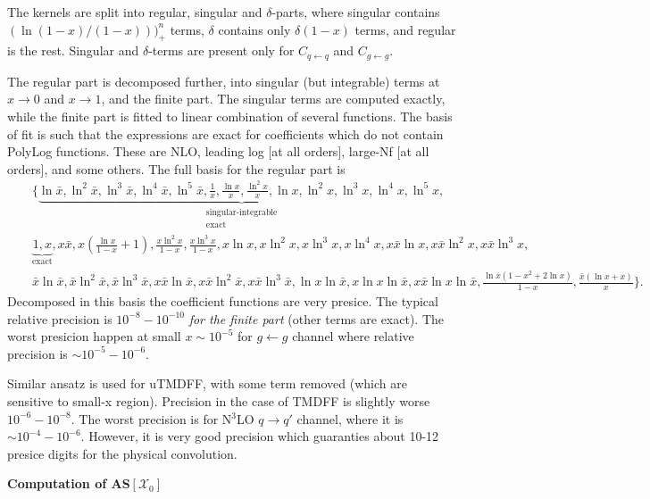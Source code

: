 \documentclass[prd,nofootinbib,eqsecnum,final]{revtex4}
\newcommand{\nn}{\nonumber}
\newcommand{\ot}{\leftarrow}
\renewcommand{\(}{\left(}
\renewcommand{\)}{\right)}
\renewcommand{\[}{\left[}
\renewcommand{\]}{\right]}
\begin{document}
The kernels are split into regular, singular and $\delta$-parts, where singular contains $(\ln(1-x)/(1-x)))_+^n$ terms, $\delta$ contains only $\delta(1-x)$ terms, and regular is the rest. Singular and $\delta$-terms are present only for $C_{q\ot q}$ and $C_{g\ot g}$.

The regular part is decomposed further, into singular (but integrable) terms at $x\to0 $ and $x\to 1$, and the finite part. The singular terms are computed exactly, while the finite part is fitted to linear combination of several functions. The basis of fit is such that the expressions are exact for coefficients which do not contain PolyLog functions. These are NLO, leading log [at all orders], large-Nf [at all orders], and some others. The full basis for the regular part is
\begin{eqnarray}
&&\Big\{\underbrace{\ln \bar x,\ln^2\bar x,\ln^3\bar x,\ln^4\bar x,\ln^5\bar x,
\frac{1}{x},\frac{\ln x}{x},\frac{\ln^2x}{x},
\ln x,\ln^2x,\ln^3x,\ln^4x,\ln^5x,}_{\substack{\text{singular-integrable} \\ \text{exact}}}
\\\nn&&
\underbrace{1,x}_{\text{exact}},x\bar x ,
x\(\frac{\ln x}{1-x}+1\), \frac{x \ln^2x}{1-x}, \frac{x\ln^3x}{1-x},
x\ln x,x\ln^2x,x\ln^3x,x\ln^4x,
x\bar x\ln x,x\bar x\ln^2x,x\bar x\ln^3x,
\\\nn &&
\bar x\ln\bar x,\bar x\ln^2\bar x,\bar x\ln^3\bar x,
x\bar x\ln\bar x,x\bar x\ln^2\bar x,x\bar x\ln^3\bar x,
\ln x\ln\bar x,x\ln x\ln\bar x,x\bar x\ln x\ln\bar x,
\frac{\ln\bar x(1-x^2+2\ln x)}{1-x},
\frac{\bar x(\ln x+x)}{x}
\Big\}.
\end{eqnarray}
Decomposed in this basis the coefficient functions are very presice. The typical relative precision is $10^{-8}-10^{-10}$ \textit{for the finite part} (other terms are exact). The worst presicion happen at small $x\sim 10^{-5}$ for $g\ot g$ channel where relative precision is $\sim 10^{-5}-10^{-6}$.

Similar ansatz is used for uTMDFF, with some term removed (which are sensitive to small-x region). Precision in the case of TMDFF is slightly worse $10^{-6}-10^{-8}$. The worst precision is for N$^3$LO $q\to q'$ channel, where it is $\sim 10^{-4}-10^{-6}$. However, it is very good precision which guaranties about 10-12 presice digits for the physical convolution.

\begin{center}
\textbf{Computation of AS$[\mathcal{X}_0]$}
\end{center}
\end{document}
